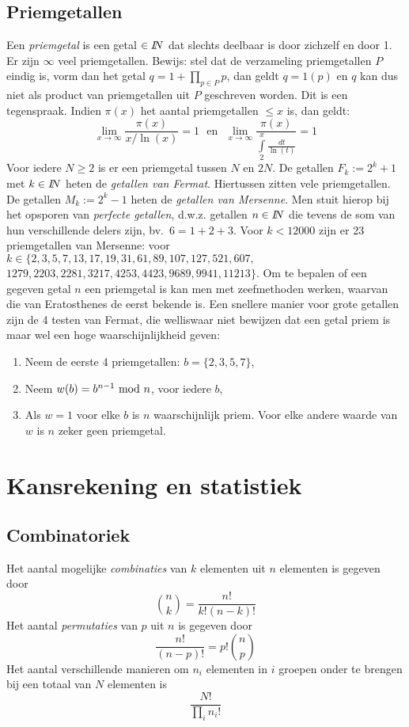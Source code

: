 \section{Priemgetallen}
Een {\it priemgetal} is een getal $\in I\hspace{-1mm}N$ dat slechts deelbaar is door
zichzelf en door 1. Er zijn $\infty$ veel priemgetallen. Bewijs: stel dat
de verzameling priemgetallen $P$ eindig is, vorm dan het getal
$q=1+\prod\limits_{p\in P}p$, dan geldt $q=1(p)$ en $q$ kan dus niet als
product van priemgetallen uit $P$ geschreven worden. Dit is een tegenspraak.
\npar
Indien $\pi(x)$ het aantal priemgetallen $\leq x$ is, dan geldt:
\[
\lim_{x\rightarrow\infty}\frac{\pi(x)}{x/\ln(x)}=1~~~\mbox{en}~~~
\lim_{x\rightarrow\infty}\frac{\pi(x)}{\int\limits_2^x\frac{dt}{\ln(t)}}=1
\]
Voor iedere $N\geq2$ is er een priemgetal tussen $N$ en $2N$.
\npar
De getallen $F_k:=2^k+1$ met $k\in I\hspace{-1mm}N$ heten de {\it getallen van Fermat}.
Hiertussen zitten vele priemgetallen.
\npar
De getallen $M_k:=2^k-1$ heten de {\it getallen van Mersenne}. Men stuit hierop
bij het opsporen van {\it perfecte getallen}, d.w.z. getallen $n\in I\hspace{-1mm}N$ die
tevens de som van hun verschillende delers zijn, bv.\ $6=1+2+3$. Voor $k<12000$
zijn er 23 priemgetallen van Mersenne: voor $k\in\{2,3,5,7,13,17,19,31,61,89,
107,127,521,607,$ $1279,2203,2281,3217,4253,4423,9689,9941,11213\}$.
\npar
Om te bepalen of een gegeven getal $n$ een priemgetal is kan men met
zeefmethoden werken, waarvan die van Eratosthenes de eerst bekende is. Een
snellere manier voor grote getallen zijn de 4 testen van Fermat, die welliswaar
niet bewijzen dat een getal priem is maar wel een hoge waarschijnlijkheid geven:
\begin{enumerate}
\item Neem de eerste 4 priemgetallen: $b=\{2,3,5,7\}$,
\item Neem $w(b)=b^{n-1}~{\rm mod}~n$, voor iedere $b$,
\item Als $w=1$ voor elke $b$ is $n$ waarschijnlijk priem. Voor elke andere
      waarde van $w$ is $n$ zeker geen priemgetal.
\end{enumerate}


\chapter{Kansrekening en statistiek}
\section{Combinatoriek}
Het aantal mogelijke {\it combinaties} van $k$ elementen uit $n$ elementen is
gegeven door
\[
{n\choose k}=\frac{n!}{k!(n-k)!}
\]
Het aantal {\it permutaties} van $p$ uit $n$ is gegeven door
\[
\frac{n!}{(n-p)!}=p!{n\choose p}
\]
Het aantal verschillende manieren om $n_i$ elementen in $i$ groepen onder te
brengen bij een totaal van $N$ elementen is
\[
\frac{N!}{\prod\limits_i n_i!}
\]

